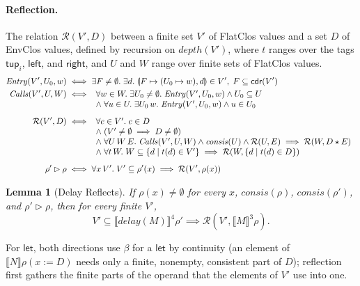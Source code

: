 \documentclass[10pt]{article}
\theoremstyle{acmplain}
\newtheorem{lemma}[theorem]{Lemma}
\newcommand{\SEM}[1]{\llbracket #1 \rrbracket}
\newcommand{\key}[1]{\mathsf{#1}}
\newcommand{\pass}[1]{\mathit{#1}}
\newcommand{\pairv}[2]{\llparenthesis #1, #2 \rrparenthesis}
\newcommand{\ext}[3]{#1(#2{:=}#3)}
\newcommand{\app}{\star}
\newcommand{\NE}{\neq\emptyset}
\newcommand{\Rel}[2]{\mathcal{R}(#1, #2)}
\newcommand{\consis}{\mathit{consis}}
\begin{document}
\paragraph{Reflection.}
The relation $\Rel{V'}{D}$ between a finite set $V'$ of FlatClos values and
a set $D$ of EnvClos values, defined by recursion on $\mathit{depth}(V')$,
where $t$ ranges over the tags $\key{tup}_i$, $\key{left}$, and $\key{right}$,
and $U$ and $W$ range over finite sets of FlatClos values.
\begin{align*}
  \mathit{Entry}(V', U_0, w) &\iff \exists F \NE.\; \exists d.\;
     \pairv{F \mapsto (U_0 \mapsto w)}{d} \in V',\; F \subseteq \key{cdr}(V') \\
  \mathit{Calls}(V', U, W) &\iff
  \begin{array}[t]{l}
    \forall w \in W.\; \exists U_0 \NE.\; \mathit{Entry}(V', U_0, w) \land U_0 \subseteq U \\
    \land\; \forall u \in U.\; \exists U_0\, w.\; \mathit{Entry}(V', U_0, w) \land u \in U_0
  \end{array} \\[1ex]
  \Rel{V'}{D} &\iff
  \begin{array}[t]{l}
    \forall c \in V'.\; c \in D \\
    \land\; (V' \NE \implies D \NE) \\
    \land\; \forall U\, W\, E.\;
       \mathit{Calls}(V', U, W) \land \consis(U) \land \Rel{U}{E} \implies \Rel{W}{D \app E} \\
    \land\; \forall t\, W.\; W \subseteq \{ d \mid t(d) \in V' \}
       \implies \Rel{W}{\{ d \mid t(d) \in D \}}
  \end{array} \\[1ex]
  \rho' \rhd \rho &\iff \forall x\, V'.\; V' \subseteq \rho'(x) \implies \Rel{V'}{\rho(x)}
\end{align*}

\begin{lemma}[Delay Reflects]\label{lem:delay-reflect}
If $\rho(x) \NE$ for every $x$, $\consis(\rho)$, $\consis(\rho')$, and $\rho' \rhd \rho$,
then for every finite $V'$,
\[
  V' \subseteq \SEM{\pass{delay}(M)}^{\mathrm{4}}\rho' \implies \Rel{V'}{\SEM{M}^{\mathrm{3}}\rho} .
\]
\end{lemma}
For $\key{let}$, both directions use $\beta$ for a $\key{let}$ by continuity
(an element of $\SEM{N}\ext{\rho}{x}{D}$ needs only a finite, nonempty,
consistent part of $D$); reflection first gathers the finite parts of the
operand that the elements of $V'$ use into one.
\end{document}
